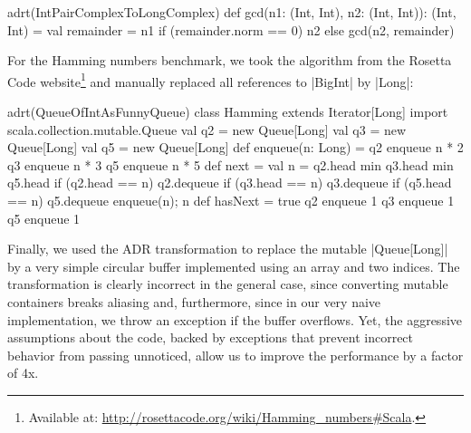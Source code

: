 \begin{lstlisting-nobreak}
adrt(IntPairComplexToLongComplex) {
  def gcd(n1: (Int, Int), n2: (Int, Int)): (Int, Int) = {
    val remainder = n1 %
    if (remainder.norm == 0) n2 else gcd(n2, remainder)
  }
}
\end{lstlisting-nobreak}

For the Hamming numbers benchmark, we took the algorithm from the Rosetta Code website\footnote{Available at: \url{http://rosettacode.org/wiki/Hamming_numbers#Scala}.} and manually replaced all references to |BigInt| by |Long|:

\begin{lstlisting-nobreak}
adrt(QueueOfIntAsFunnyQueue) {
  class Hamming extends Iterator[Long] {
    import scala.collection.mutable.Queue
    val q2 = new Queue[Long]
    val q3 = new Queue[Long]
    val q5 = new Queue[Long]
    def enqueue(n: Long) = {
      q2 enqueue n * 2
      q3 enqueue n * 3
      q5 enqueue n * 5
    }
    def next = {
      val n = q2.head min q3.head min q5.head
      if (q2.head == n) q2.dequeue
      if (q3.head == n) q3.dequeue
      if (q5.head == n) q5.dequeue
      enqueue(n); n
    }
    def hasNext = true
    q2 enqueue 1
    q3 enqueue 1
    q5 enqueue 1
  }
}
\end{lstlisting-nobreak}

Finally, we used the ADR transformation to replace the mutable |Queue[Long]| by a very simple circular buffer implemented using an array and two indices. The transformation is clearly incorrect in the general case, since converting mutable containers breaks aliasing and, furthermore, since in our very naive implementation, we throw an exception if the buffer overflows. Yet, the aggressive assumptions about the code, backed by exceptions that prevent incorrect behavior from passing unnoticed, allow us to improve the performance by a factor of 4x.


